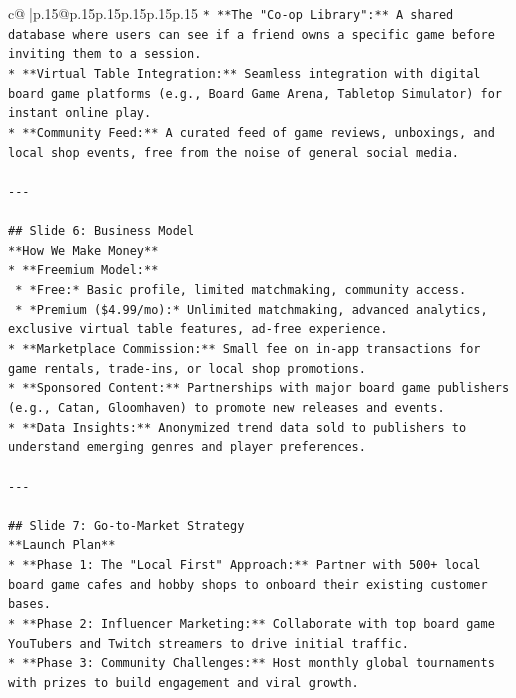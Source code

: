 \documentclass{article}
\begin{document}
{\begin{supertabular}{c@{$\;$}|p{.15\linewidth}@{}p{.15\linewidth}p{.15\linewidth}p{.15\linewidth}p{.15\linewidth}p{.15\linewidth}}
{{{\texttt{*   **The "Co{-}op Library":** A shared database where users can see if a friend owns a specific game before inviting them to a session.} \\
\texttt{*   **Virtual Table Integration:** Seamless integration with digital board game platforms (e.g., Board Game Arena, Tabletop Simulator) for instant online play.} \\
\texttt{*   **Community Feed:** A curated feed of game reviews, unboxings, and local shop events, free from the noise of general social media.} \\
\\ 
\texttt{{-}{-}{-}} \\
\\ 
\texttt{\#\# Slide 6: Business Model} \\
\texttt{**How We Make Money**} \\
\texttt{*   **Freemium Model:**} \\
\texttt{    *   *Free:* Basic profile, limited matchmaking, community access.} \\
\texttt{    *   *Premium (\$4.99/mo):* Unlimited matchmaking, advanced analytics, exclusive virtual table features, ad{-}free experience.} \\
\texttt{*   **Marketplace Commission:** Small fee on in{-}app transactions for game rentals, trade{-}ins, or local shop promotions.} \\
\texttt{*   **Sponsored Content:** Partnerships with major board game publishers (e.g., Catan, Gloomhaven) to promote new releases and events.} \\
\texttt{*   **Data Insights:** Anonymized trend data sold to publishers to understand emerging genres and player preferences.} \\
\\ 
\texttt{{-}{-}{-}} \\
\\ 
\texttt{\#\# Slide 7: Go{-}to{-}Market Strategy} \\
\texttt{**Launch Plan**} \\
\texttt{*   **Phase 1: The "Local First" Approach:** Partner with 500+ local board game cafes and hobby shops to onboard their existing customer bases.} \\
\texttt{*   **Phase 2: Influencer Marketing:** Collaborate with top board game YouTubers and Twitch streamers to drive initial traffic.} \\
\texttt{*   **Phase 3: Community Challenges:** Host monthly global tournaments with prizes to build engagement and viral growth.} \\
}}}
\end{supertabular}}
\end{document}
